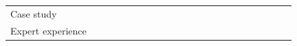 \documentclass[english, 12pt, a4paper, sci, utf8, a-1b, online]{aaltothesis}
\begin{document}
\begin{center}
\begin{longtable}{p{0.3\linewidth}p{0.6\linewidth}}
    Case study                                   & \textcite{how-developers-experience-team-performance} \newline \textcite{paw}                                                                                                                                                                                                                                                                                                                                                                                                                                                                                                                                                                                                                                                                                                                                                                                                                                                                      \\
    Expert experience                            & \textcite{entering-an-ecosystem} \newline \textcite{myers2016improving} \newline \textcite{macvean2016api} \newline \textcite{karpanoja2016exploring} \newline \textcite{nazariodetecting}                                                                                                                                                                                                                                                                                                                                                                                                                                                                                                                                                                                                                                                                                                                                                         \\

\end{longtable}
\end{center}
\end{document}

